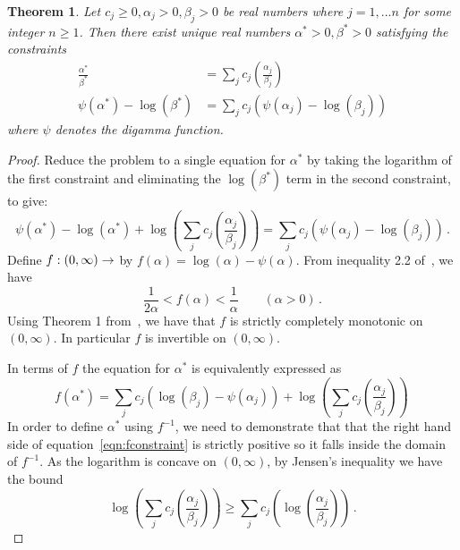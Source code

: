 \documentclass[twoside, 11pt]{article}
\newtheorem{thm}{Theorem}
\begin{document}
\begin{thm}
Let $c_j \geq 0, \alpha_j > 0, \beta_j > 0$ be real numbers where $j = 1, \ldots n$ for some integer $n \geq 1$. Then there exist unique real numbers $\alpha^{*} > 0, \beta^{*} > 0$ satisfying the constraints
\begin{align}
\frac{\alpha^*}{\beta^*}
& = \sum_j c_j \left( \frac{\alpha_j}{\beta_j} \right) \\
\psi(\alpha^*) - \log(\beta^*)
& = \sum_j c_j \left( \psi(\alpha_j) - \log(\beta_j) \right)
\end{align}
where $\psi$ denotes the digamma function.
\end{thm}
\begin{proof}
Reduce the problem to a single equation for $\alpha^*$ by taking the logarithm of the first constraint and eliminating the $\log(\beta^*)$ term in the second constraint, to give:
\begin{equation}
\psi(\alpha^*) - \log(\alpha^*) + \log\left( \sum_j c_j \left(\frac{\alpha_j}{\beta_j}\right) \right) = \sum_j c_j \left( \psi(\alpha_j) - \log(\beta_j) \right) \, . \nonumber
\end{equation}
Define $f : (0, \infty) \rightarrow \real$ by $f(\alpha) = \log(\alpha) - \psi(\alpha)$. From inequality 2.2 of~\citet*{alzer1997some}, we have
\begin{equation}
\frac{1}{2\alpha} < f(\alpha) < \frac{1}{\alpha} \qquad (\alpha>0)\, . \label{eqn:fbounds}
\end{equation}
Using Theorem 1 from~\citet*{alzer1997some}, we have that $f$ is strictly completely monotonic on $(0, \infty)$. In particular $f$ is invertible on $(0, \infty)$.

In terms of $f$ the equation for $\alpha^*$ is equivalently expressed as
\begin{equation}
f(\alpha^*) = 
\sum_j c_j \left( \log(\beta_j) - \psi(\alpha_j) \right)
+ \log\left( \sum_j c_j \left(\frac{\alpha_j}{\beta_j}\right) \right) \, \label{eqn:fconstraint}
\end{equation}
In order to define $\alpha^*$ using $f^{-1}$, we need to demonstrate that that the right hand side of equation~\ref{eqn:fconstraint} is strictly positive so it falls inside the domain of $f^{-1}$. As the logarithm is concave on $(0, \infty)$, by Jensen's inequality we have the bound
\begin{equation}
\log\left( \sum_j c_j \left(\frac{\alpha_j}{\beta_j}\right) \right)
\geq
\sum_j c_j \left( \log\left(\frac{\alpha_j}{\beta_j}\right) \right) \, . \label{eqn:logjensenbound}
\end{equation}


\end{proof}
\end{document}
